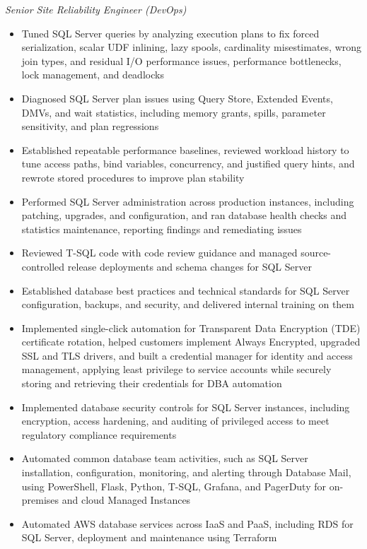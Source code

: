 \documentclass[10pt,a4paper]{article}
\begin{document}
\textit{Senior Site Reliability Engineer (DevOps)}\\[-5pt]
\begin{itemize}
  \item Tuned SQL Server queries by analyzing execution plans to fix forced serialization, scalar UDF inlining, lazy spools, cardinality misestimates, wrong join types, and residual I/O performance issues, performance bottlenecks, lock management, and deadlocks
  \item Diagnosed SQL Server plan issues using Query Store, Extended Events, DMVs, and wait statistics, including memory grants, spills, parameter sensitivity, and plan regressions
  \item Established repeatable performance baselines, reviewed workload history to tune access paths, bind variables, concurrency, and justified query hints, and rewrote stored procedures to improve plan stability
  \item Performed SQL Server administration across production instances, including patching, upgrades, and configuration, and ran database health checks and statistics maintenance, reporting findings and remediating issues
  \item Reviewed T-SQL code with code review guidance and managed source-controlled release deployments and schema changes for SQL Server
  \item Established database best practices and technical standards for SQL Server configuration, backups, and security, and delivered internal training on them
  \item Implemented single-click automation for Transparent Data Encryption (TDE) certificate rotation, helped customers implement Always Encrypted, upgraded SSL and TLS drivers, and built a credential manager for identity and access management, applying least privilege to service accounts while securely storing and retrieving their credentials for DBA automation
  \item Implemented database security controls for SQL Server instances, including encryption, access hardening, and auditing of privileged access to meet regulatory compliance requirements
  \item Automated common database team activities, such as SQL Server installation, configuration, monitoring, and alerting through Database Mail, using PowerShell, Flask, Python, T-SQL, Grafana, and PagerDuty for on-premises and cloud Managed Instances
  \item Automated AWS database services across IaaS and PaaS, including RDS for SQL Server, deployment and maintenance using Terraform

\end{itemize}
\end{document}
